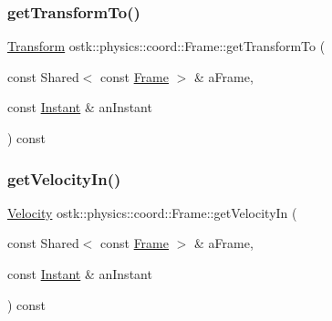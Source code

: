 \mbox{\label{classostk_1_1physics_1_1coord_1_1_frame_aa6f51c81724f36644ad8343a1124c264}} 
\subsubsection{\texorpdfstring{get\+Transform\+To()}{getTransformTo()}}
{\footnotesize\ttfamily \hyperlink{classostk_1_1physics_1_1coord_1_1_transform}{Transform} ostk\+::physics\+::coord\+::\+Frame\+::get\+Transform\+To (\begin{DoxyParamCaption}\item[{const Shared$<$ const \hyperlink{classostk_1_1physics_1_1coord_1_1_frame}{Frame} $>$ \&}]{a\+Frame,  }\item[{const \hyperlink{classostk_1_1physics_1_1time_1_1_instant}{Instant} \&}]{an\+Instant }\end{DoxyParamCaption}) const}

\mbox{\label{classostk_1_1physics_1_1coord_1_1_frame_ab2d8bdcd3f68604d4ca104341f51b7f1}} 
\subsubsection{\texorpdfstring{get\+Velocity\+In()}{getVelocityIn()}}
{\footnotesize\ttfamily \hyperlink{classostk_1_1physics_1_1coord_1_1_velocity}{Velocity} ostk\+::physics\+::coord\+::\+Frame\+::get\+Velocity\+In (\begin{DoxyParamCaption}\item[{const Shared$<$ const \hyperlink{classostk_1_1physics_1_1coord_1_1_frame}{Frame} $>$ \&}]{a\+Frame,  }\item[{const \hyperlink{classostk_1_1physics_1_1time_1_1_instant}{Instant} \&}]{an\+Instant }\end{DoxyParamCaption}) const}

\mbox{\label{classostk_1_1physics_1_1coord_1_1_frame_aa4c778fa91e6599cdea0a889fd5bf69c}} 
